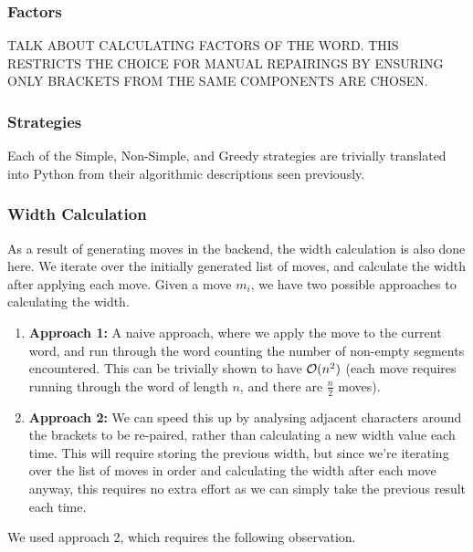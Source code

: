 \subsubsection{Factors}
TALK ABOUT CALCULATING FACTORS OF THE WORD. THIS RESTRICTS THE CHOICE FOR MANUAL REPAIRINGS BY ENSURING ONLY BRACKETS FROM THE SAME COMPONENTS ARE CHOSEN.

\subsubsection{Strategies}
Each of the Simple, Non-Simple, and Greedy strategies are trivially translated into Python from their algorithmic descriptions seen previously.

\subsubsection{Width Calculation}
As a result of generating moves in the backend, the width calculation is also done here. We iterate over the initially generated list of moves, and calculate the width after applying each move. Given a move $m_{i}$, we have two possible approaches to calculating the width.
\begin{enumerate}
    \item \textbf{Approach 1:} A naive approach, where we apply the move to the current word, and run through the word counting the number of non-empty segments encountered. This can be trivially shown to have $\mathcal{O}(n^{2})$ (each move requires running through the word of length $n$, and there are $\frac{n}{2}$ moves).
    \item \textbf{Approach 2:} We can speed this up by analysing adjacent characters around the brackets to be re-paired, rather than calculating a new width value each time. This will require storing the previous width, but since we're iterating over the list of moves in order and calculating the width after each move anyway, this requires no extra effort as we can simply take the previous result each time.
\end{enumerate}
We used approach 2, which requires the following observation.

